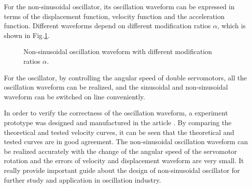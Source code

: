 \documentclass[conference]{IEEEtran}
\begin{document}
For the non-sinusoidal oscillator, its oscillation waveform can be expressed in terms of the displacement function, velocity function and the acceleration function. Different waveforms depend on different modification ratios $\alpha$, which is shown in Fig.\ref{fig4-5/6/7/8}.

\begin{figure}[!h]
\centering
{}
\quad
{}
\quad
{}
\quad
{}
\caption{Non-sinusoidal oscillation waveform with different modification ratios $\alpha$.}
\label{fig4-5/6/7/8}
\end{figure}

For the oscillator, by controlling the angular speed of double servomotors, all the oscillation waveform can be realized, and the sinusoidal and non-sinusoidal waveform can be switched on line conveniently. 

In order to verify the correctness of the oscillation waveform,  a experiment prototype was designed and manufactured in the article \cite{b11}. By comparing the theoretical and tested velocity curves, it can be seen that the theoretical and tested curves are in good agreement. The non-sinusoidal oscillation waveform can be realized accurately with the change of the angular speed of the servomotor rotation and the errors of velocity and displacement waveform are very small. It really provide important guide about the design of non-sinusoidal oscillator for further study and application in oscillation industry. 
\end{document}
